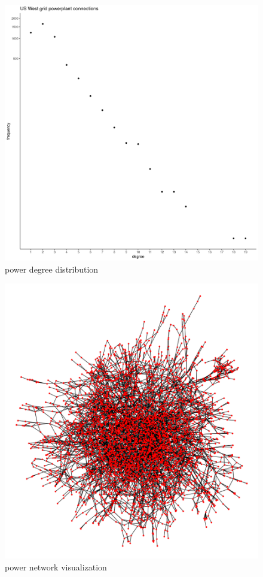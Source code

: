 \documentclass[a4paper]{article}
\begin{document}
\begin{enumerate}[label={(1.\alph*):}]
        \begin{figure}
            \includegraphics[width=\linewidth]{./power_deg_dist_log.png}
            \caption{power degree distribution}
            \label{fig:power_log}
        \end{figure}

        \begin{figure}
            \includegraphics[width=\linewidth]{./power_vis.png}
            \caption{power network visualization}
            \label{fig:power_vis}
        \end{figure}

\end{enumerate}
\end{document}
